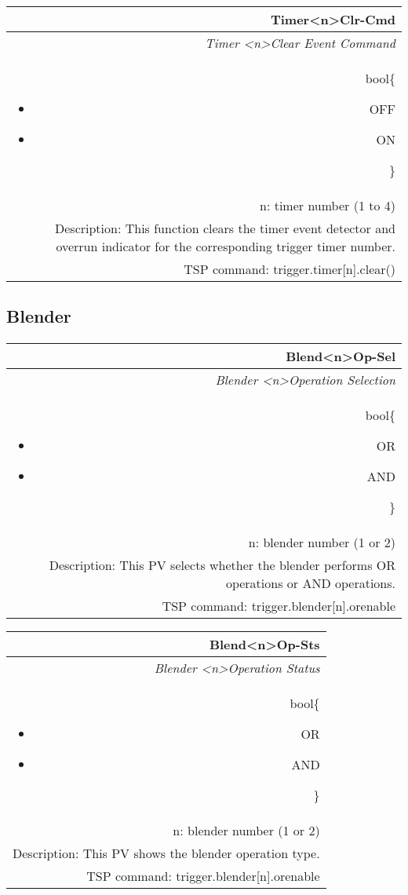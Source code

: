 \documentclass[openany]{article}
\begin{document}
		\begin{tabular}{N}
			\hline
			\bfseries Timer{\textless n\textgreater}Clr-Cmd\label{pv:timerclr-cmd} \\ \hline
			\emph{Timer \textless n\textgreater Clear Event Command} \\
			bool\{\begin{itemize}[noitemsep]
				\small
				\item[] OFF
				\item[] ON
			\end{itemize}\} \\
			n: timer number (1 to 4) \\
			Description: This function clears the timer event detector and overrun indicator for the corresponding trigger timer number. \\
			TSP command: trigger.timer[n].clear()
		\end{tabular}

	\subsection{Blender}\label{pvgroup:blender}

		\paragraph{} %

		\begin{tabular}{N}
			\hline
			\bfseries Blend{\textless n\textgreater}Op-Sel\label{pv:blendop-sel} \\ \hline
			\emph{Blender \textless n\textgreater Operation Selection} \\
			bool\{\begin{itemize}[noitemsep]
				\small
				\item[] OR
				\item[] AND
			\end{itemize}\} \\
			n: blender number (1 or 2) \\
			Description: This PV selects whether the blender performs OR operations or AND operations. \\
			TSP command: trigger.blender[n].orenable
		\end{tabular}

		\begin{tabular}{N}
			\hline
			\bfseries Blend{\textless n\textgreater}Op-Sts\label{pv:blendop-sts} \\ \hline
			\emph{Blender \textless n\textgreater Operation Status} \\
			bool\{\begin{itemize}[noitemsep]
				\small
				\item[] OR
				\item[] AND
			\end{itemize}\} \\
			n: blender number (1 or 2) \\
			Description: This PV shows the blender operation type. \\
			TSP command: trigger.blender[n].orenable
		\end{tabular}
\end{document}
